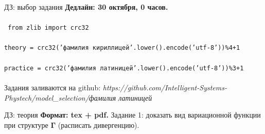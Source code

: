 \documentclass[10pt,pdf,utf8,russian,aspectratio=169]{beamer}
\begin{document}
\begin{frame}{ДЗ: выбор задания}
\textbf{Дедлайн: 30 октября, 0 часов.}\\~\\

\texttt{ from zlib import crc32}\\~\\
\texttt{theory = crc32('фамилия кириллицей'.lower().encode('utf-8'))\%4+1}\\~\\
\texttt{practice = crc32('фамилия латиницей'.lower().encode('utf-8'))\%3+1}\\~\\

Задания заливаются на github:
\textit{https://github.com/Intelligent-Systems-Phystech/model\_selection/фамилия латиницей}\\

\end{frame}


\begin{frame}{ДЗ: теория}
\textbf{Формат: tex + pdf.}
Задание 1: доказать вид вариационной функции при структуре $\boldsymbol{\Gamma}$ (расписать дивергенцию).
\end{frame}
\end{document}
